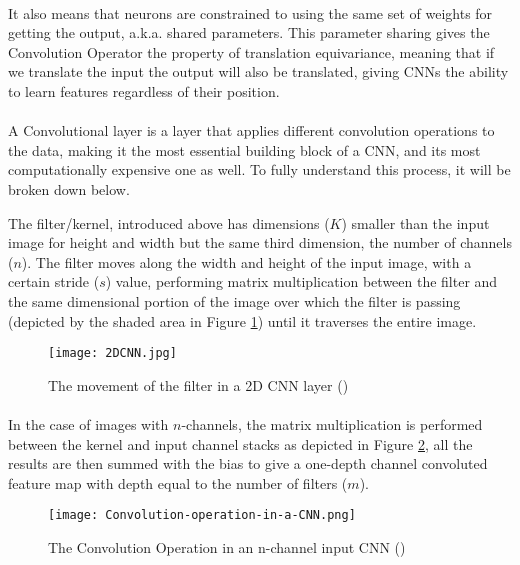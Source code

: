 \paragraph{}
It also means that neurons are constrained to using the same set of weights for getting the output, \gls{a.k.a.} shared parameters. This parameter sharing gives the Convolution Operator the property of translation equivariance, meaning that if we translate the input the output will also be translated, giving \gls{CNN}s the ability to learn features regardless of their position.
\paragraph{}
A Convolutional layer is a layer that applies different convolution operations to the data, making it the most essential building block of a \gls{CNN}, and its most computationally expensive one as well. To fully understand this process, it will be broken down below.

The filter/kernel, introduced above has dimensions ($K$) smaller than the input image for height and width but the same third dimension, the number of channels ($n$). The filter moves along the width and height of the input image, with a certain stride ($s$) value, performing matrix multiplication between the filter and the same dimensional portion of the image over which the filter is passing (depicted by the shaded area in Figure \ref{fig_cnn_filter}) until it traverses the entire image.

    \begin{figure}[hbt!]
        \centering
        \texttt{[image: 2DCNN.jpg]}
        \caption{The movement of the filter in a 2D \gls{CNN} layer (\cite{2dcnnpic})}
        \label{fig_cnn_filter}
    \end{figure}
    
\paragraph{}   
In the case of images with $n$-channels, the matrix multiplication is performed between the kernel and input channel stacks as depicted in Figure \ref{fig_cnn_conv}, all the results are then summed with the bias to give a one-depth channel convoluted feature map with depth equal to the number of filters ($m$).

    \begin{figure}[hbt!]
        \centering
        \texttt{[image: Convolution-operation-in-a-CNN.png]}
        \caption{The Convolution Operation in an n-channel input \gls{CNN} (\cite{9053228})}
        \label{fig_cnn_conv}
    \end{figure}
    
